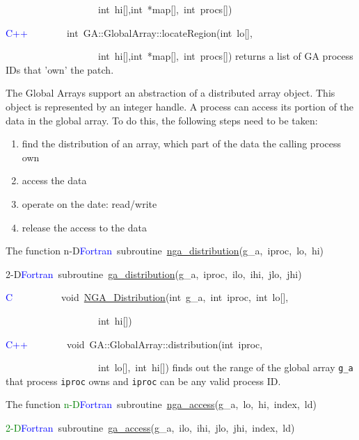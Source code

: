 ~~~~~~~~~~~~~~~~~~~int~hi{[}{]},int~{*}map{[}{]},~int~procs{[}{]})~

\textcolor{blue}{C++}~~~~~~~~int~GA::GlobalArray::locateRegion(int~lo{[}{]},~

~~~~~~~~~~~~~~~~~~~int~hi{[}{]},int~{*}map{[}{]},~int~procs{[}{]})
returns a list of GA process IDs that 'own' the patch.

The Global Arrays support an abstraction of a distributed array object.
This object is represented by an integer handle. A process can access
its portion of the data in the global array. To do this, the following
steps need to be taken:
\begin{enumerate}
\item find the distribution of an array, which part of the data the calling
process own 
\item access the data 
\item operate on the date: read/write 
\item release the access to the data
\end{enumerate}
The function
n-D\textcolor{blue}{Fortran}~subroutine~\href{http://www.emsl.pnl.gov/docs/global/ga_ops.html\#ga_distribute}{nga\_{}distribution}(g\_a,~iproc,~lo,~hi)~

2-D\textcolor{blue}{Fortran}~subroutine~\href{http://www.emsl.pnl.gov/docs/global/ga_ops.html\#ga_distribute}{ga\_{}distribution}(g\_a,~iproc,~ilo,~ihi,~jlo,~jhi)

\textcolor{blue}{C}~~~~~~~~~~void~\href{http://www.emsl.pnl.gov/docs/global/c_nga_ops.html\#ga_distribute}{NGA\_{}Distribution}(int~g\_a,~int~iproc,~int~lo{[}{]},~

~~~~~~~~~~~~~~~~~~~int~hi{[}{]})

\textcolor{blue}{C++}~~~~~~~~void~GA::GlobalArray::distribution(int~iproc,~

~~~~~~~~~~~~~~~~~~~int~lo{[}{]},~int~hi{[}{]})
finds out the range of the global array \texttt{g\_a} that process
\texttt{iproc} owns and \texttt{iproc} can be any valid process ID.

The function
\textcolor{green}{n-D}\textcolor{blue}{Fortran}~subroutine~\href{http://www.emsl.pnl.gov/docs/global/ga_ops.html\#ga_access}{nga\_{}access}(g\_a,~lo,~hi,~index,~ld)~

\textcolor{green}{2-D}\textcolor{blue}{Fortran}~subroutine~\href{http://www.emsl.pnl.gov/docs/global/ga_ops.html\#ga_access}{ga\_{}access}(g\_a,~ilo,~ihi,~jlo,~jhi,~index,~ld)

